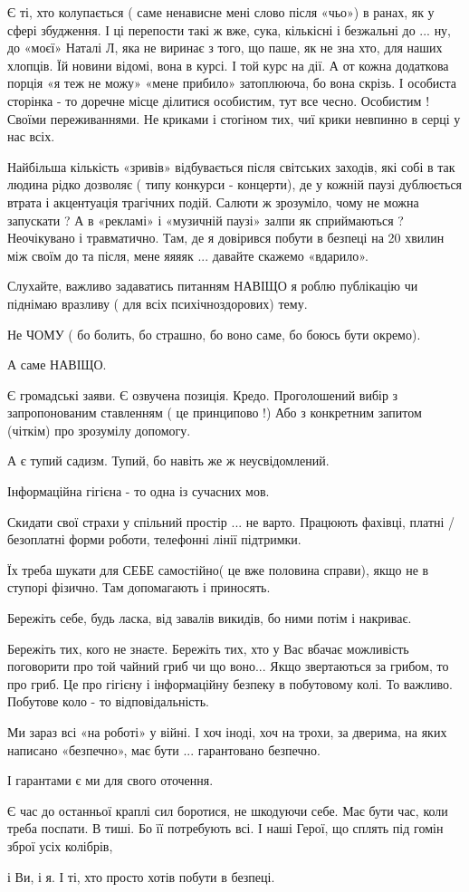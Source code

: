 Є ті, хто колупається ( саме ненависне мені слово після «чьо») в ранах, як у
сфері збудження. І ці перепости  такі ж вже, сука, кількісні і безжальні до ...
ну, до «моєї» Наталі Л, яка не виринає  з того, що паше, як не зна хто, для
наших хлопців. Їй новини відомі, вона в курсі. І той курс на дії. А от кожна
додаткова порція «я теж не можу» «мене прибило» затоплююча, бо вона скрізь.  І
особиста сторінка - то доречне місце ділитися особистим, тут все чесно.
Особистим ! Своїми переживаннями. Не криками і стогіном тих, чиї крики
невпинно в серці у нас всіх. 

Найбільша кількість «зривів» відбувається після світських заходів, які собі в
так людина рідко дозволяє ( типу конкурси - концерти), де у кожній паузі
дублюється втрата і акцентуація трагічних подій. Салюти ж зрозуміло, чому не
можна запускати ? А в «рекламі» і «музичній паузі» залпи як сприймаються ?
Неочікувано і травматично. Там, де я довірився побути в безпеці на 20 хвилин
між своїм до та після, мене яяяяк  ... давайте скажемо «вдарило». 

Слухайте, важливо задаватись питанням НАВІЩО я роблю публікацію чи піднімаю
вразливу ( для всіх психічноздорових) тему.

Не ЧОМУ ( бо болить, бо страшно, бо воно саме, бо боюсь бути окремо).

А саме НАВІЩО. 

Є громадські заяви. Є озвучена позиція. Кредо. Проголошений  вибір з
запропонованим ставленням ( це принципово !) Або з конкретним запитом (чіткім)
про зрозумілу допомогу. 

А є тупий садизм. Тупий, бо навіть же ж неусвідомлений. 

Інформаційна гігієна - то одна із сучасних мов. 

Скидати свої страхи у спільний простір ... не варто.  Працюють фахівці, платні /
безоплатні форми роботи, телефонні лінії підтримки.

Їх треба шукати для СЕБЕ самостійно( це вже половина справи), якщо не в ступорі
фізично. Там допомагають і приносять. 

Бережіть себе, будь ласка, від завалів викидів, бо ними потім і накриває. 

Бережіть тих, кого не знаєте. Бережіть тих, хто  у Вас вбачає можливість
поговорити про той чайний гриб чи що воно... Якщо звертаються за грибом, то про
гриб.  Це про гігієну і інформаційну безпеку в побутовому колі. То важливо.
Побутове коло - то відповідальність.

Ми зараз всі «на роботі» у війні. І хоч іноді, хоч на трохи, за дверима, на
яких написано «безпечно», має бути ... гарантовано безпечно. 

І гарантами є ми для свого оточення.

Є час до останньої краплі сил боротися, не шкодуючи себе. Має бути час, коли
треба поспати. В тиші. Бо її потребують всі. І наші Герої, що сплять під гомін
зброї усіх колібрів, 

і Ви, і я.  І ті, хто просто хотів побути в безпеці.
